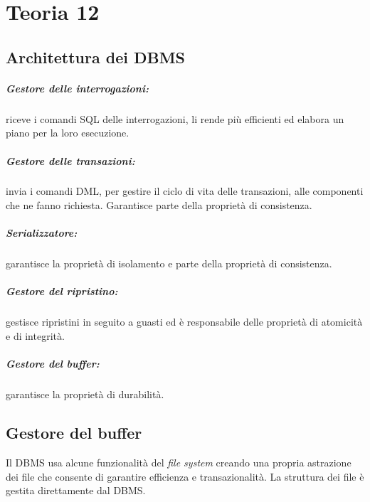 \chapter{Teoria 12}

\section{Architettura dei DBMS}

\paragraph{Gestore delle interrogazioni:} riceve i comandi SQL delle interrogazioni, li rende più efficienti ed elabora un piano per la loro esecuzione.

\paragraph{Gestore delle transazioni:} invia i comandi DML, per gestire il ciclo di vita delle transazioni, alle componenti che ne fanno richiesta. Garantisce parte della proprietà di consistenza.

\paragraph{Serializzatore:} garantisce la proprietà di isolamento e parte della proprietà di consistenza.

\paragraph{Gestore del ripristino:} gestisce ripristini in seguito a guasti ed è responsabile delle proprietà di atomicità e di integrità.

\paragraph{Gestore del buffer:} garantisce la proprietà di durabilità.

\section{Gestore del buffer}

Il DBMS usa alcune funzionalità del \textit{file system} creando una propria astrazione dei file che consente di garantire efficienza e transazionalità. La struttura dei file è gestita direttamente dal DBMS.

